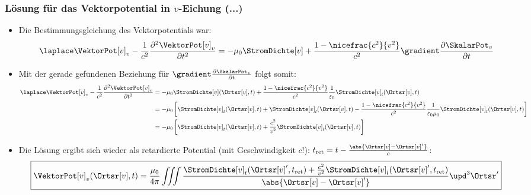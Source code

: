 \begin{frame}
  \frametitle{Lösung für das Vektorpotential in $v$-Eichung (...)}
  \begin{itemize}[<+->]
  \item Die Bestimmungsgleichung des Vektorpotentials war:
    \begin{equation*}
      \laplace\VektorPot[v]_v -\frac{1}{c^2}\frac{\partial^2\VektorPot[v]_v}{\partial t^2} = -\mu_0\StromDichte[v] + \frac{1-\nicefrac{c^2}{v^2}}{c^2} \gradient\frac{\partial \SkalarPot_v}{\partial t}
      \end{equation*}
    \item Mit der gerade gefundenen Beziehung für $\gradient\frac{\partial \SkalarPot_v}{\partial t}$ folgt somit:
      \begin{equation}
        \begin{aligned}
          \laplace\VektorPot[v]_v -\frac{1}{c^2}\frac{\partial^2\VektorPot[v]_v}{\partial t^2} &= -\mu_0\StromDichte[v](\Ortsr[v], t) + \frac{1-\nicefrac{c^2}{v^2}}{c^2}\frac{1}{\varepsilon_0} \StromDichte[v]_l(\Ortsr[v], t)\\
          &=-\mu_0\left[ \StromDichte[v]_t(\Ortsr[v], t) + \StromDichte[v]_l(\Ortsr[v], t) - \frac{1-\nicefrac{c^2}{v^2}}{c^2}\frac{1}{\varepsilon_0\mu_0} \StromDichte[v]_l(\Ortsr[v], t) \right]\\
          &= -\mu_0\left[ \StromDichte[v]_t(\Ortsr[v], t) + \frac{c^2}{v^2} \StromDichte[v]_l(\Ortsr[v], t)\right]
          \end{aligned}
        \end{equation}
      \item Die Lösung ergibt sich wieder als retardierte Potential (mit Geschwindigkeit $c$!): $t_{\text{ret}} = t - \frac{\abs{\Ortsr[v]-\Ortsr[v]^\prime}}{c}$:
        \begin{equation}
          \boxed{%
          \VektorPot[v]_v(\Ortsr[v], t) = \frac{\mu_0}{4\pi} \iiint \frac{\StromDichte[v]_t (\Ortsr[v]^\prime, t_{\text{ret}}) +\frac{c^2}{v^2} \StromDichte[v]_l (\Ortsr[v]^\prime, t_{\text{ret}})}{\abs{\Ortsr[v]-\Ortsr[v]^\prime}} \upd^3\Ortsr^\prime}
          \end{equation}
  \end{itemize}
\end{frame}

